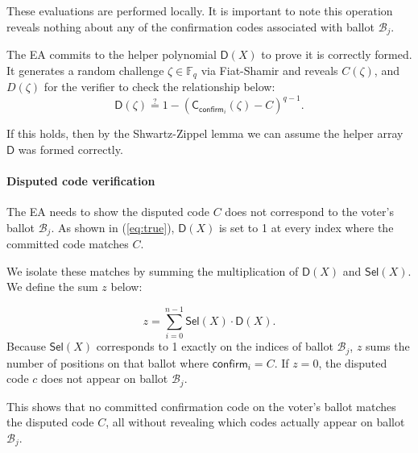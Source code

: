 These evaluations are performed locally. It is important to note this operation reveals nothing about any of the confirmation codes associated with ballot $\mathcal{B}_j$. 


The EA commits to the helper polynomial $\mathsf{D}(X)$ to prove it is correctly formed. It generates a random challenge $\zeta\in\mathbb{F}_q$ via Fiat-Shamir and reveals $C(\zeta)$, and $D(\zeta)$ for the verifier to check the relationship below:
\[
\mathsf{D}(\zeta) \stackrel{?}{=} 1 - (\mathsf{C}_{\mathsf{confirm}_i}(\zeta) - C)^{q - 1}.
\]

If this holds, then by the Shwartz-Zippel lemma we can assume the helper array $\mathsf{D}$ was formed correctly. 











\paragraph{Disputed code verification}\mbox{}\newline
The EA needs to show the disputed code $C$ does not correspond to the voter's ballot $\mathcal{B}_j$.
As shown in (\ref{eq:true}), $\mathsf{D}(X)$ is set to 1 at every index where the committed code matches $C$.

We isolate these matches by summing the multiplication of $\mathsf{D}(X)$ and $\mathsf{Sel}(X)$. 
We define the sum $z$ below:

\begin{equation}
  z = \sum_{i=0}^{n-1} \mathsf{Sel}(X) \cdot \mathsf{D}(X).
\end{equation}
Because $\mathsf{Sel}(X)$ corresponds to 1 exactly on the indices of ballot $\mathcal{B}_j$, $z$ sums the number of positions on that
ballot where $\mathsf{confirm}_i = C$. If $z = 0$, the disputed code $c$ does not appear on ballot $\mathcal{B}_j$.

This shows that no committed confirmation code on the
voter's ballot matches the disputed code $C$, all without revealing which codes
actually appear on ballot $\mathcal{B}_j$.


